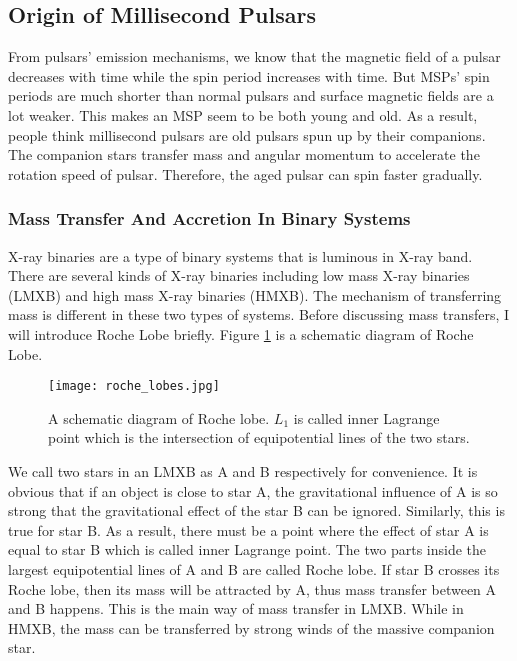 \documentclass[a4paper, 12pt]{report}
\begin{document}
    \subsection{Origin of Millisecond Pulsars}
      From pulsars' emission mechanisms, we know that the magnetic field of a pulsar 
      decreases with time while the spin period increases with time. But MSPs' spin 
      periods are much shorter than normal pulsars and surface magnetic fields are a 
      lot weaker. This makes an MSP seem to be both young and old. As a result,
      people think millisecond pulsars are old pulsars spun up by their companions. 
      The companion stars transfer mass and angular momentum to accelerate the rotation
      speed of pulsar. Therefore, the aged pulsar can spin faster gradually. 

      \subsubsection{Mass Transfer And Accretion In Binary Systems}
        X-ray binaries are a type of binary systems that is luminous in X-ray band. 
        There are several kinds of X-ray binaries including low mass X-ray binaries 
        (LMXB) and high mass X-ray binaries (HMXB). The mechanism of transferring mass 
        is different in these two types of systems. Before discussing mass 
        transfers, I will introduce Roche Lobe briefly. Figure 
        \ref{fig:roche lobe} is a schematic diagram of Roche Lobe.
        \begin{figure}[!htp]
          \centering
          \texttt{[image: roche\_lobes.jpg]}
          \caption[A schematic diagram of Roche lobe.]
                  {A schematic diagram of Roche lobe. \protect $L_{1}$ is called inner 
                    Lagrange point which is the intersection of equipotential lines 
                    of the two stars.}
          \label{fig:roche lobe}
        \end{figure}
        We call two stars in an LMXB as A and B respectively for convenience. It is 
        obvious that if an object is close to star A, the gravitational influence of A 
        is so strong that the gravitational effect of the star B can be ignored. Similarly, 
        this is true for star B. As a result, there must be a point where the effect 
        of star A is equal to star B which is called inner Lagrange point.
        The two parts inside the largest equipotential lines of A and B are called Roche 
        lobe. If star B crosses its Roche lobe, then its mass will be attracted by A, 
        thus mass transfer between A and B happens. This is the main way of mass transfer 
        in LMXB. While in HMXB, the mass can be transferred by strong winds of the massive 
        companion star. 
\end{document}
